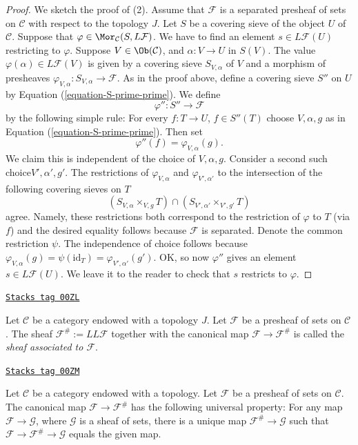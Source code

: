 \begin{proof}
\medskip\noindent
We sketch the proof of (2). Assume that $\mathcal{F}$ is a
separated presheaf of sets on $\mathcal{C}$ with respect to
the topology $J$.
Let $S$ be a covering sieve of the object $U$ of $\mathcal{C}$.
Suppose that $\varphi \in \Mor_\mathcal{C}(S, L\mathcal{F})$.
We have to find an element $s \in L\mathcal{F}(U)$ restricting
to $\varphi$. Suppose $V\in \Ob(\mathcal{C})$, and
$\alpha : V \to U$ in $S(V)$. The value $\varphi(\alpha)
\in L\mathcal{F}(V)$ is given by a covering sieve
$S_{V, \alpha}$ of $V$ and a morphism of presheaves
$\varphi_{V, \alpha} : S_{V, \alpha} \to \mathcal{F}$.
As in the proof above, define a covering sieve $S''$ on $U$ by
Equation (\ref{equation-S-prime-prime}). We define
$$
\varphi'' : S'' \longrightarrow \mathcal{F}
$$
by the following simple rule: For every $f : T \to U$,
$f \in S''(T)$ choose $V, \alpha, g$ as in
Equation (\ref{equation-S-prime-prime}). Then set
$$
\varphi''(f) = \varphi_{V, \alpha}(g).
$$
We claim this is independent of the
choice of $V, \alpha, g$.
Consider a second such choice$ V', \alpha', g'$.
The restrictions of $\varphi_{V, \alpha}$ and
$\varphi_{V', \alpha'}$ to the intersection
of the following covering sieves on $T$
$$
(S_{V, \alpha} \times_{V, g} T) \cap (S_{V', \alpha'} \times_{V', g'} T)
$$
agree. Namely, these restrictions both correspond to the
restriction of $\varphi$ to $T$ (via $f$) and the desired
equality follows because $\mathcal{F}$ is separated.
Denote the common restriction $\psi$.
The independence of choice follows because
$\varphi_{V, \alpha}(g) = \psi(\text{id}_T) =
\varphi_{V', \alpha'}(g')$. OK, so now $\varphi''$
gives an element $s \in L\mathcal{F}(U)$. We leave it to
the reader to check that $s$ restricts to $\varphi$.
\end{proof}

\begin{definition}
\label{sites-definition-associated-sheaf-topology}
\href{https://stacks.math.columbia.edu/tag/00ZL}{\texttt{Stacks tag 00ZL}}

Let $\mathcal{C}$ be a category endowed with a topology $J$.
Let $\mathcal{F}$ be a presheaf of sets on $\mathcal{C}$.
The sheaf $\mathcal{F}^\# := LL\mathcal{F}$
together with the canonical map $\mathcal{F} \to \mathcal{F}^\#$
is called the {\it sheaf associated to $\mathcal{F}$}.
\end{definition}

\begin{proposition}
\label{sites-proposition-sheafification-adjoint-topology}
\href{https://stacks.math.columbia.edu/tag/00ZM}{\texttt{Stacks tag 00ZM}}

Let $\mathcal{C}$ be a category endowed with a topology.
Let $\mathcal{F}$ be a presheaf of sets on $\mathcal{C}$.
The canonical map $\mathcal{F} \to \mathcal{F}^\#$ has the
following universal property: For any map
$\mathcal{F} \to \mathcal{G}$,
where $\mathcal{G}$ is a sheaf of sets, there is a unique map
$\mathcal{F}^\# \to \mathcal{G}$ such that $\mathcal{F} \to \mathcal{F}^\#
\to \mathcal{G}$ equals the given map.
\end{proposition}


